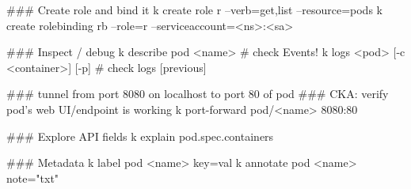\begin{cheatcodebashbold}
### Create role and bind it
k create role r --verb=get,list --resource=pods
k create rolebinding rb --role=r --serviceaccount=<ns>:<sa>
\end{cheatcodebashbold}

\begin{cheatcodebashbold}
### Inspect / debug
k describe pod <name>              # check Events!
k logs <pod> [-c <container>] [-p] # check logs [previous] 
\end{cheatcodebashbold}

\begin{cheatcodebashbold}
### tunnel from port 8080 on localhost to port 80 of pod
### CKA: verify pod's web UI/endpoint is working
k port-forward pod/<name> 8080:80
\end{cheatcodebashbold}

\begin{cheatcodebash}
### Explore API fields
k explain pod.spec.containers
\end{cheatcodebash}


\begin{cheatcodebash}
### Metadata
k label pod <name> key=val
k annotate pod <name> note="txt"
\end{cheatcodebash}
